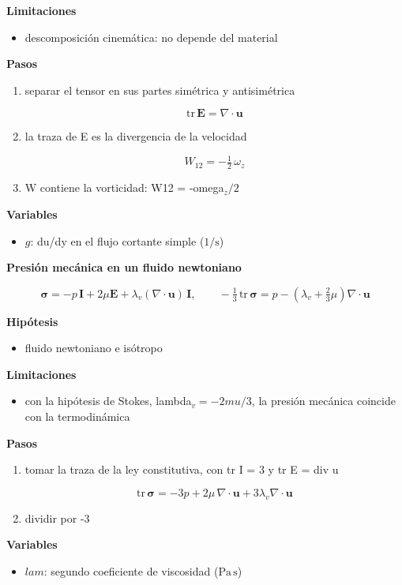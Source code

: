 \documentclass[10pt,openany]{book}
\begin{document}
\begin{tcolorbox}[title={Desarrollos del modelo}, studiumdef, breakable]
\noindent\textbf{Limitaciones}
\begin{itemize}
\item descomposición cinemática: no depende del material
\end{itemize}

\noindent\textbf{Pasos}
\begin{enumerate}
\item
separar el tensor en sus partes simétrica y antisimétrica

\[
\mathrm{tr}\,\mathbf{E} = \nabla\cdot\mathbf{u}
\]
\item
la traza de E es la divergencia de la velocidad

\[
W_{12} = -\tfrac12\,\omega_z
\]
\item
W contiene la vorticidad: W12 = -omega\(_z/2\)
\end{enumerate}

\noindent\textbf{Variables}
\begin{itemize}
\item $g$: du/dy en el flujo cortante simple ($\mathrm{1/s}$)
\end{itemize}



\noindent\textbf{Presión mecánica en un fluido newtoniano}

\begin{equation}
\boldsymbol{\sigma} = -p\,\mathbf{I} + 2\mu\mathbf{E} + \lambda_v(\nabla\cdot\mathbf{u})\,\mathbf{I},\qquad -\tfrac13\,\mathrm{tr}\,\boldsymbol{\sigma} = p - \left(\lambda_v + \tfrac23\mu\right)\nabla\cdot\mathbf{u}
\label{eq:c13-presion-mecanica}
\end{equation}

\noindent\textbf{Hipótesis}
\begin{itemize}
\item fluido newtoniano e isótropo
\end{itemize}

\noindent\textbf{Limitaciones}
\begin{itemize}
\item con la hipótesis de Stokes, lambda\(_v = -2 mu/3\), la presión mecánica coincide con la termodinámica
\end{itemize}

\noindent\textbf{Pasos}
\begin{enumerate}
\item
tomar la traza de la ley constitutiva, con tr I = 3 y tr E = div u

\[
\mathrm{tr}\,\boldsymbol{\sigma} = -3p + 2\mu\,\nabla\cdot\mathbf{u} + 3\lambda_v\nabla\cdot\mathbf{u}
\]
\item
dividir por -3
\end{enumerate}

\noindent\textbf{Variables}
\begin{itemize}
\item $lam$: segundo coeficiente de viscosidad ($\mathrm{Pa}\,\mathrm{s}$)
\end{itemize}


\end{tcolorbox}
\end{document}

